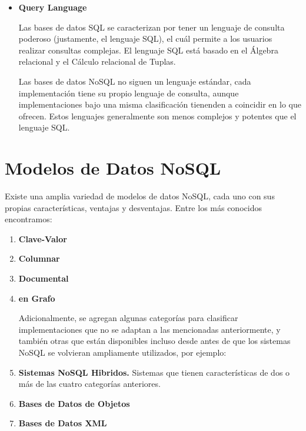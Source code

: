 \documentclass[pdflatex,sn-mathphys-num]{sn-jnl}
\theoremstyle{thmstyleone}%
\theoremstyle{thmstyletwo}%
\theoremstyle{thmstylethree}%
\begin{document}
\begin{itemize}
    \item \textbf{Query Language}

    Las bases de datos SQL se caracterizan por tener un lenguaje de consulta poderoso (justamente, el lenguaje SQL), el cuál permite a los usuarios realizar consultas complejas. El lenguaje SQL está basado en el Álgebra relacional y el Cálculo relacional de Tuplas.

    Las bases de datos NoSQL no siguen un lenguaje estándar, cada implementación tiene su propio lenguaje de consulta, aunque implementaciones bajo una misma clasificación tienenden a coincidir en lo que ofrecen. Estos lenguajes generalmente son menos complejos y potentes que el lenguaje SQL.

    
\end{itemize}

\section{Modelos de Datos NoSQL}\label{sec4}

Existe una amplia variedad de modelos de datos NoSQL, cada uno con sus propias características, ventajas y desventajas. Entre los más conocidos encontramos:

\begin{enumerate}
    \item \textbf{Clave-Valor}
    \item \textbf{Columnar}
    \item \textbf{Documental}
    \item \textbf{en Grafo}

    \vspace{0.1cm}
    
    \noindent
    Adicionalmente, se agregan algunas categorías para clasificar implementaciones que no se adaptan a las mencionadas anteriormente, y también otras que están disponibles incluso desde antes de que los sistemas NoSQL se volvieran ampliamente utilizados, por ejemplo:

    \vspace{0.1cm}
        
    \item \textbf{Sistemas NoSQL Hibridos.} Sistemas que tienen características de dos o más de las cuatro categorías anteriores.
    \item \textbf{Bases de Datos de Objetos} 
    \item \textbf{Bases de Datos XML}
\end{enumerate}
\end{document}
